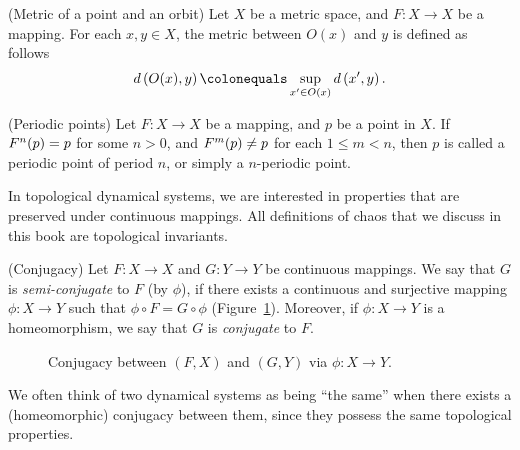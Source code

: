 \documentclass[10pt,twoside,draft]{book}
\begin{document}
\begin{definition}
  (Metric of a point and an orbit)
  Let $X$ be a metric space, and $F: X \to X$ be a mapping.
  For each $x,y \in X$, the metric between $O(x)$ and $y$ is defined as follows
  \begin{equation*}
    \metric{O(x),y} \ceq \sup\limits_{x' \in O(x)} \metric{x',y}.
  \end{equation*}
\end{definition}
\begin{definition}
  (Periodic points)
  Let $F: X \to X$ be a mapping, and $p$ be a point in $X$.
  If $F^{n}(p) = p$ for some $n > 0$, and $F^{m}(p) \neq p$ for each $1 \leq m < n$, then $p$ is called a periodic point of period $n$, or simply a $n$-periodic point.
  \label{def:porbit}
\end{definition}

In topological dynamical systems, we are interested in properties that are preserved under continuous mappings.
All definitions of chaos that we discuss in this book are topological invariants.
\begin{definition}
  (Conjugacy)
  Let $F: X \to X$ and $G: Y \to Y$ be continuous mappings.
  We say that $G$ is \textit{semi-conjugate} to $F$ (by $\phi$), if there exists a continuous and surjective mapping $\phi: X \to Y$ such that $\phi\circ F = G\circ\phi$ (Figure~\ref{fig:conj}).
  Moreover, if $\phi: X \to Y$ is a homeomorphism, we say that $G$ is \textit{conjugate} to $F$.
\end{definition}
\begin{figure}[ht]
  \centering
  \caption{Conjugacy between $(F, X)$ and $(G, Y)$ via $\phi: X \to Y$.}
  \label{fig:conj}
\end{figure}
We often think of two dynamical systems as being ``the same'' when there exists a (homeomorphic) conjugacy between them, since they possess the same topological properties.




\printindex
\end{document}
